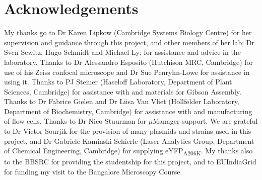 \documentclass[../main.tex]{subfiles}
\begin{document}
\section*{Acknowledgements}

My thanks go to Dr Karen Lipkow (Cambridge Systems Biology Centre) for her supervision and guidance through this project, and other members of her lab; Dr Sven Sewitz, Hugo Schmidt and Michael Ly; for assistance and advice in the laboratory. Thanks to Dr Alessandro Esposito (Hutchison MRC, Cambridge) for use of his Zeiss confocal microscope and Dr Sue Penryhn-Lowe for assistance in using it. Thanks to PJ Steiner (Haseloff Laboratory, Department of Plant Sciences, Cambridge) for assistance with and materials for Gibson Assembly. Thanks to Dr Fabrice Gielen and Dr Liisa Van Vliet (Hollfelder Laboratory, Department of Biochemistry, Cambridge) for assistance with and manufacturing of flow cells. Thanks to Dr Nico Stuurman for \(\mu\)Manager support. We are grateful to Dr Victor Sourjik for the provision of many plasmids and strains used in this project, and Dr Gabriele Kaminski Schierle (Laser Analytics Group, Department of Chemical Engineering, Cambridge) for supplying eYFP\textsubscript{A206K}. My thanks also to the BBSRC for providing the studentship for this project, and to EUIndiaGrid for funding my visit to the Bangalore Microscopy Course.
\end{document}

